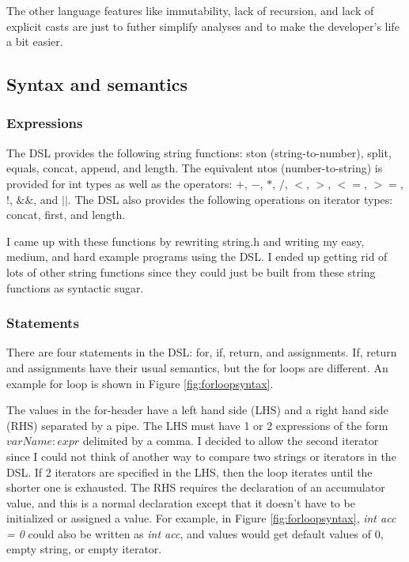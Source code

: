 \documentclass[letterpaper]{article}
\begin{document}
The other language features like immutability, lack of recursion, and lack of
explicit casts are just to futher simplify analyses and to make the developer's
life a bit easier.

\subsection{Syntax and semantics}

\subsubsection{Expressions}

The DSL provides the following string functions: ston (string-to-number), split,
equals, concat, append, and length. The equivalent ntos (number-to-string) is
provided for int types as well as the operators: $+$, $-$, $*$, $/$, $<$, $>$, $<=$,
$>=$, $!$, $\&\&$, and $||$. The DSL also provides the following operations on
iterator types: concat, first, and length.

I came up with these functions by rewriting string.h and writing my easy, medium,
and hard example programs using the DSL. I ended up getting rid of lots of other
string functions since they could just be built from these string functions as
syntactic sugar.

\subsubsection{Statements}

There are four statements in the DSL: for, if, return, and assignments. If, return
and assignments have their usual semantics, but the for loops are different. An example
for loop is shown in Figure \ref{fig:forloopsyntax}.

The values in the for-header
have a left hand side (LHS) and a right hand side (RHS) separated by a pipe. The LHS
must have 1 or 2 expressions of the form $varName : expr$ delimited by a comma. I
decided to allow the second iterator since I could not think of another way to compare
two strings or iterators in the DSL. If 2 iterators are specified in the LHS, then the
loop iterates until the shorter one is exhausted. The RHS requires the declaration of an
accumulator value, and this is a normal declaration except that it doesn't have to be
initialized or assigned a value. For example, in Figure \ref{fig:forloopsyntax},
\textit{int acc = 0} could also be written as \textit{int acc}, and values would get default values
of 0, empty string, or empty iterator.
\end{document}
